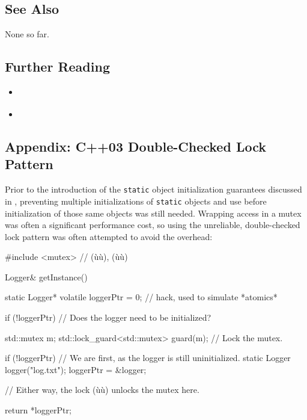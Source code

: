 \subsection[See Also]{See Also}\label{see-also}

None so far.

\subsection[Further Reading]{Further Reading}\label{further-reading}

\begin{itemize}
\item{\cite{meyers04}}
\item{\cite{stroustrup20}}
\end{itemize}

\subsection[Appendix: C++03 Double-Checked Lock Pattern]{Appendix: C++03 Double-Checked Lock Pattern}\label{appendix:-c++03-double-checked-lock-pattern}

Prior to the introduction of the  \lstinline!static!
object initialization guarantees discussed in , preventing multiple initializations of \lstinline!static! objects
and use before initialization of those same objects was still needed.
Wrapping access in a mutex was often a significant performance cost, so
using the unreliable, double-checked lock pattern was often attempted to
avoid the overhead:

\begin{emcppshiddenlisting}[emcppsbatch=e16]
#include <mutex>  // (ù{}ù), (ù{}ù)
\end{emcppshiddenlisting}
\begin{emcppslisting}[emcppsbatch=e16]
Logger& getInstance()
{
    static Logger* volatile loggerPtr = 0;  // hack, used to simulate *atomics*

    if (!loggerPtr)  // Does the logger need to be initialized?
    {
        std::mutex m;
        std::lock_guard<std::mutex> guard(m);  // Lock the mutex.

        if (!loggerPtr)  // We are first, as the logger is still uninitialized.
        {
            static Logger logger("log.txt");
            loggerPtr = &logger;
        }
    }                    // Either way, the lock (ù{}ù) unlocks the mutex here.

    return *loggerPtr;
}
\end{emcppslisting}

